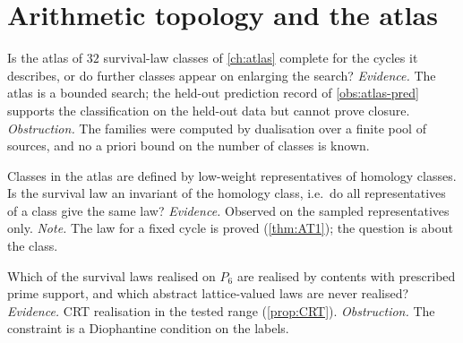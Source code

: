 \section{Arithmetic topology and the atlas}
\begin{problem}\label{prob:atlas-closure}
Is the atlas of $32$ survival-law classes of \cref{ch:atlas} complete for the cycles it describes, or do further classes appear on enlarging the search? \emph{Evidence.} The atlas is a bounded search; the held-out prediction record of \cref{obs:atlas-pred} supports the classification on the held-out data but cannot prove closure. \emph{Obstruction.} The families were computed by dualisation over a finite pool of sources, and no a priori bound on the number of classes is known.
\end{problem}
\begin{problem}\label{prob:representatives}
Classes in the atlas are defined by low-weight representatives of homology classes. Is the survival law an invariant of the homology class, i.e.\ do all representatives of a class give the same law? \emph{Evidence.} Observed on the sampled representatives only. \emph{Note.} The law for a fixed cycle is proved (\cref{thm:AT1}); the question is about the class.
\end{problem}
\begin{problem}[realisability]\label{prob:realisability}
Which of the survival laws realised on $P_6$ are realised by contents with prescribed prime support, and which abstract lattice-valued laws are never realised? \emph{Evidence.} CRT realisation in the tested range (\cref{prop:CRT}). \emph{Obstruction.} The constraint is a Diophantine condition on the labels.
\end{problem}

